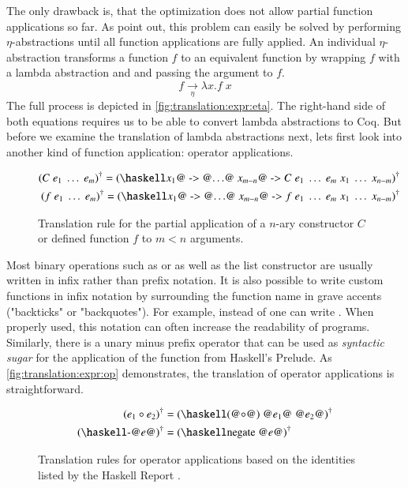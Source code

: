 The only drawback is, that the optimization does not allow partial function applications so far.
As \cite{Abel:2005} point out, this problem can easily be solved by performing $\eta$-abstractions until all function applications are fully applied.
An individual $\eta$-abstraction transforms a function $f$ to an equivalent function by wrapping $f$ with a lambda abstraction and and passing the argument to $f$.
\[
  f \xrightarrow[\eta]{} \lambda x. f\;x
\]
The full process is depicted in \autoref{fig:translation:expr:eta}.
The right-hand side of both equations requires us to be able to convert lambda abstractions to Coq.
But before we examine the translation of lambda abstractions next, lets first look into another kind of function application: operator applications.
\begin{figure}[H]
  \begin{align*}
    \toCoq{(C\;e_1\;\ldots\;e_m)} = \toCoq{(\haskellM{\@$x_1$@ -> @$\ldots$@ \@$x_{m - n}$@ ->}\; C\;e_1\;\ldots\;e_m\;x_1\;\ldots\;x_{n - m})} \\
    \toCoq{(f\;e_1\;\ldots\;e_m)} = \toCoq{(\haskellM{\@$x_1$@ -> @$\ldots$@ \@$x_{m - n}$@ ->}\; f\;e_1\;\ldots\;e_m\;x_1\;\ldots\;x_{n - m})}
  \end{align*}
  \caption{Translation rule for the partial application of a $n$-ary constructor $C$ or defined function $f$ to $m < n$ arguments.}
  \label{fig:translation:expr:eta}
\end{figure}

Most binary operations such as \haskell{(+)} or \haskell{(==)} as well as the list constructor \haskell{(:)} are usually written in infix rather than prefix notation.
It is also possible to write custom functions in infix notation by surrounding the function name in grave accents ("backticks" or "backquotes").
For example, instead of  one can write .
When properly used, this notation can often increase the readability of programs.
Similarly, there is a unary minus prefix operator that can be used as \textit{syntactic sugar} for the application of the  function from Haskell's Prelude.
As \autoref{fig:translation:expr:op} demonstrates, the translation of operator applications is straightforward.

\begin{figure}[H]
  \begin{align*}
    \toCoq{(e_1 \circ e_2)} &= \toCoq{(\haskellM{(@$\circ$@) @$e_1$@ @$e_2$@})} \\
    \toCoq{(\haskellM{-@$e$@})} &= \toCoq{(\haskellM{negate @$e$@})}
  \end{align*}
  \caption{
    Translation rules for operator applications based on the identities listed by the Haskell Report \cite[p.~18]{Marlow:2010}.
  }
  \label{fig:translation:expr:op}
\end{figure}

